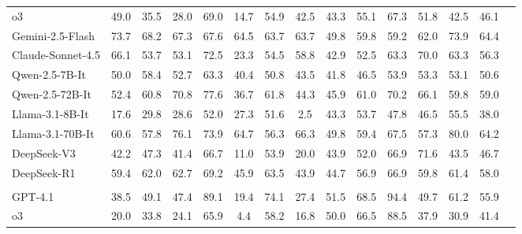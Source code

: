 \documentclass[sigconf]{acmart}
\begin{document}
\begin{table}[!t]
\begin{adjustbox}{width=0.95\linewidth}
\begin{tabular}{lcccccccccccccc}
o3 & 49.0 & 35.5 & \cellcolor{red!20}28.0 & 69.0 & 14.7 & 54.9 & 42.5 & 43.3 & 55.1 & 67.3 & 51.8 & \cellcolor{red!20}42.5 & 46.1 \\

Gemini-2.5-Flash & \cellcolor{green!20}73.7 & \cellcolor{green!20}68.2 & 67.3 & 67.6 & 64.5 & 63.7 & 63.7 & \cellcolor{green!20}49.8 & 59.8 & 59.2 & 62.0 & 73.9 & \cellcolor{green!20}64.4 \\

Claude-Sonnet-4.5 & 66.1 & 53.7 & 53.1 & 72.5 & 23.3 & 54.5 & 58.8 & 42.9 & 52.5 & 63.3 & 70.0 & 63.3 & 56.3 \\

Qwen-2.5-7B-It & 50.0 & 58.4 & 52.7 & 63.3 & 40.4 & \cellcolor{red!20}50.8 & 43.5 & \cellcolor{red!20}41.8 & \cellcolor{red!20}46.5 & 53.9 & 53.3 & 53.1 & 50.6 \\

Qwen-2.5-72B-It & 52.4 & 60.8 & 70.8 & \cellcolor{green!20}77.6 & 36.7 & 61.8 & 44.3 & 45.9 & \cellcolor{green!20}61.0 & \cellcolor{green!20}70.2 & 66.1 & 59.8 & 59.0 \\

Llama-3.1-8B-It & \cellcolor{red!20}17.6 & \cellcolor{red!20}29.8 & 28.6 & \cellcolor{red!20}52.0 & 27.3 & 51.6 & \cellcolor{red!20}2.5 & 43.3 & 53.7 & \cellcolor{red!20}47.8 & \cellcolor{red!20}46.5 & 55.5 & \cellcolor{red!20}38.0 \\

Llama-3.1-70B-It & 60.6 & 57.8 & \cellcolor{green!20}76.1 & 73.9 & \cellcolor{green!20}64.7 & 56.3 & \cellcolor{green!20}66.3 & \cellcolor{green!20}49.8 & 59.4 & 67.5 & 57.3 & \cellcolor{green!20}80.0 & 64.2 \\

DeepSeek-V3 & 42.2 & 47.3 & 41.4 & 66.7 & \cellcolor{red!20}11.0 & 53.9 & 20.0 & 43.9 & 52.0 & 66.9 & \cellcolor{green!20}71.6 & 43.5 & 46.7 \\

DeepSeek-R1 & 59.4 & 62.0 & 62.7 & 69.2 & 45.9 & 63.5 & 43.9 & 44.7 & 56.9 & 66.9 & 59.8 & 61.4 & 58.0 \\



\midrule
\rowcolor{purple!9!white} \multicolumn{14}{c}{\textit{\textbf{Turn = 3}}} \\ \midrule

GPT-4.1 & 38.5 & 49.1 & 47.4 & 89.1 & 19.4 & 74.1 & 27.4 & 51.5 & 68.5 & \cellcolor{green!20}94.4 & 49.7 & 61.2 & 55.9 \\
o3 & 20.0 & 33.8 & 24.1 & 65.9 & \cellcolor{red!20}4.4 & 58.2 & 16.8 & 50.0 & 66.5 & 88.5 & 37.9 & 30.9 & 41.4 \\


\end{tabular}
\end{adjustbox}
\end{table}
\end{document}
